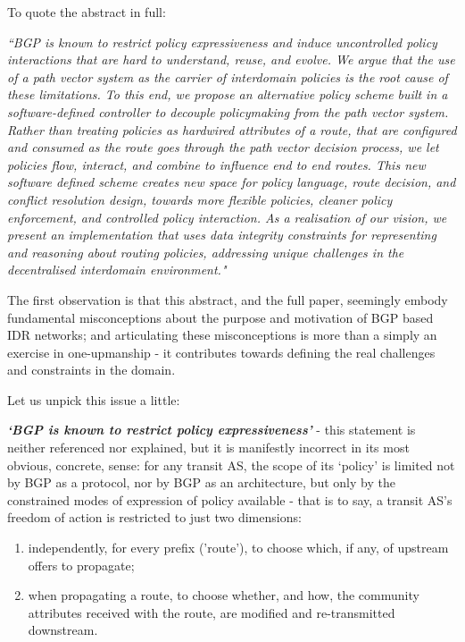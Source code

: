 To quote the abstract in full:

\emph{``BGP is known to restrict policy expressiveness and induce uncontrolled
	policy interactions that are hard to understand, reuse, and evolve.
	We argue that the use of a path vector system as the carrier of
	interdomain policies is the root cause of these limitations.
	To this end, we propose an alternative policy scheme built in a
	software-defined controller to decouple policymaking from the path vector system.
	Rather than treating policies as hardwired attributes of a route, that are
	configured and consumed as the route goes through the path vector decision
	process, we let policies flow, interact, and combine to influence end to end routes.
	This new software defined scheme creates new space for policy language, route
	decision, and conflict resolution design, towards more flexible policies,
	cleaner policy enforcement, and controlled policy interaction.
	As a realisation of our vision, we present an implementation that uses
	data integrity constraints for representing and reasoning about routing policies,
	addressing unique challenges in the decentralised interdomain environment."}

The first observation is that this abstract, and the full paper, seemingly embody fundamental misconceptions about the purpose and motivation of BGP based IDR networks; and articulating these misconceptions is more than a simply an
exercise in one-upmanship - it contributes towards defining the real challenges and constraints in the domain.

Let us unpick this issue a little:

\textbf{\textit{`BGP is known to restrict policy expressiveness'}} - this
statement is neither referenced nor explained,
but it is manifestly incorrect in its most obvious, concrete, sense: for
any transit AS, the scope of its `policy' is limited not by BGP as a protocol,
nor by BGP as an architecture, but only by the constrained modes of expression
of policy available - that is to say, a transit AS's freedom of action is
restricted to just two dimensions:

\begin{enumerate}
	\item independently, for every prefix ('route'), to choose which, if any, of upstream offers to propagate;
	\item when propagating a route, to choose whether, and how, the
	      community attributes received with the route, are modified and
	      re-transmitted downstream.
\end{enumerate}

